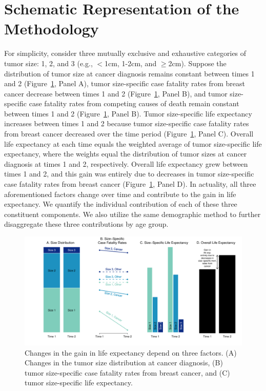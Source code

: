 \documentclass[11pt,letterpaper]{article}
\theoremstyle{plain}
\theoremstyle{remark}
\numberwithin{equation}{section}
\begin{document}
\section{Schematic Representation of the Methodology}
For simplicity, consider three mutually exclusive and exhaustive
categories of tumor size: 1, 2, and 3 (e.g., $<$1cm, 1-2cm, and
$\geq$2cm).  Suppose the distribution of tumor size at cancer
diagnosis remains constant between times 1 and 2
(Figure~\ref{fig:simple_case}, Panel A), tumor size-specific case
fatality rates from breast cancer decrease between times 1 and 2
(Figure~\ref{fig:simple_case}, Panel B), and tumor size-specific case
fatality rates from competing causes of death remain constant between
times 1 and 2 (Figure~\ref{fig:simple_case}, Panel B).  Tumor
size-specific life expectancy increases between times 1 and 2 because
tumor size-specific case fatality rates from breast cancer decreased
over the time period (Figure~\ref{fig:simple_case}, Panel C).  Overall
life expectancy at each time equals the weighted average of tumor
size-specific life expectancy, where the weights equal the
distribution of tumor sizes at cancer diagnosis at times 1 and 2,
respectively.  Overall life expectancy grew between times 1 and 2, and
this gain was entirely due to decreases in tumor size-specific case
fatality rates from breast cancer (Figure~\ref{fig:simple_case}, Panel
D).  In actuality, all three aforementioned factors change over time
and contribute to the gain in life expectancy.  We quantify the
individual contribution of each of these three constituent components.
We also utilize the same demographic method to further disaggregate
these three contributions by age group.
\begin{figure}[!h]
\begin{center}
\includegraphics[width=\linewidth]{figure1.pdf}
\caption{Changes in the gain in life expectancy depend on three factors.  (A) Changes in the tumor size distribution at cancer diagnosis, (B) tumor size-specific case fatality rates from breast cancer, and (C) tumor size-specific life expectancy.} 
\label{fig:simple_case}
\end{center}
\end{figure}
\end{document}
